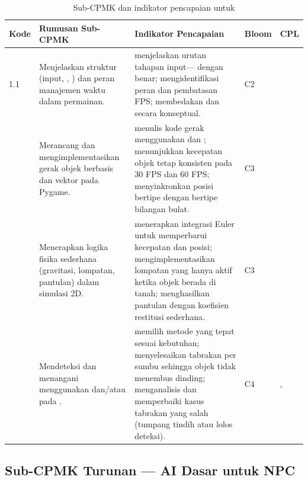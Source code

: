 \begin{table}[htbp]
\centering
\caption{Sub-CPMK dan indikator pencapaian untuk }
\label{tab:subcpmk1}
\begin{tabularx}{\textwidth}{@{}L{1.5cm} L{3.9cm} Y L{1.5cm} L{2.4cm}@{}}
\toprule
\headrow \textbf{Kode} & \textbf{Rumusan Sub-CPMK} & \textbf{Indikator Pencapaian} & \textbf{Bloom} & \textbf{CPL} \\
 &
Menjelaskan struktur  (input, , ) dan peran manajemen waktu dalam permainan. &
 menjelaskan urutan tahapan input---- dengan benar;
 mengidentifikasi peran  dan pembatasan FPS;
 membedakan  dan  secara konseptual. &
C2 &  \\
 &
Merancang dan mengimplementasikan gerak objek berbasis  dan vektor pada Pygame. &
 menulis kode gerak menggunakan  dan ;
 menunjukkan kecepatan objek tetap konsisten pada 30 FPS dan 60 FPS;
 menyinkronkan posisi bertipe  dengan  bertipe bilangan bulat. &
C3 &  \\
 &
Menerapkan logika fisika sederhana (gravitasi, lompatan, pantulan) dalam simulasi 2D. &
 menerapkan integrasi Euler untuk memperbarui kecepatan dan posisi;
 mengimplementasikan lompatan yang hanya aktif ketika objek berada di tanah;
 menghasilkan pantulan dengan koefisien restitusi sederhana. &
C3 &  \\
 &
Mendeteksi dan menangani  menggunakan  dan/atau  pada . &
 memilih metode  yang tepat sesuai kebutuhan;
 menyelesaikan tabrakan per sumbu sehingga objek tidak menembus dinding;
 menganalisis dan memperbaiki kasus tabrakan yang salah (tumpang tindih atau lolos deteksi). &
C4 & ,  \\
\bottomrule
\end{tabularx}
\end{table}

\subsection{Sub-CPMK Turunan  --- AI Dasar untuk NPC}

